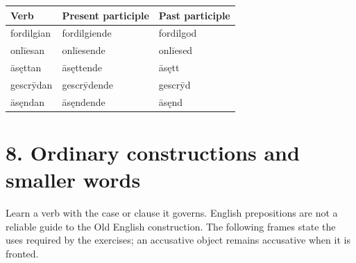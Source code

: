 \par\begingroup
\fontsize{10.5}{13.2}\selectfont
\setlength{\LTleft}{0pt}\setlength{\LTright}{\fill}
\noindent
\begin{tabular}{@{}>{\raggedright\arraybackslash}p{32.04mm}>{\raggedright\arraybackslash}p{47.09mm}>{\raggedright\arraybackslash}p{39.25mm}@{}}
\toprule
\textbf{Verb} & \textbf{Present participle} & \textbf{Past participle} \\
\midrule
fordilgian & fordilgiende & fordilgod \\
onlīesan & onlīesende & onlīesed \\
āsęttan & āsęttende & āsętt \\
gescrȳdan & gescrȳdende & gescrȳd \\
āsęndan & āsęndende & āsęnd \\
\bottomrule
\end{tabular}
\par\endgroup

\section*{8. Ordinary constructions and smaller words}

Learn a verb with the case or clause it governs. English prepositions are not a reliable guide to the Old English construction. The following frames state the uses required by the exercises; an accusative object remains accusative when it is fronted.

